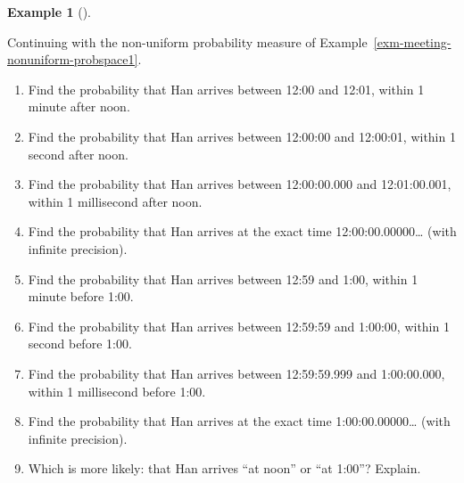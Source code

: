 \documentclass[
  letterpaper,
  DIV=11,
  numbers=noendperiod]{scrreprt}
\providecommand{\tightlist}{%
  \setlength{\itemsep}{0pt}\setlength{\parskip}{0pt}}
\theoremstyle{plain}
\theoremstyle{definition}
\newtheorem{example}{Example}[chapter]
\theoremstyle{definition}
\theoremstyle{definition}
\theoremstyle{remark}
\begin{document}
\begin{tcolorbox}[enhanced jigsaw, opacityback=0, left=2mm, colframe=quarto-callout-note-color-frame, toprule=.15mm, breakable, colback=white, leftrule=.75mm, arc=.35mm, rightrule=.15mm, bottomrule=.15mm]

\begin{example}[]\protect\hypertarget{exm-meeting-probspace1d-limit-nonuniform}{}\label{exm-meeting-probspace1d-limit-nonuniform}

Continuing with the non-uniform probability measure of
Example~\ref{exm-meeting-nonuniform-probspace1}.

\begin{enumerate}
\def\labelenumi{\arabic{enumi}.}
\tightlist
\item
  Find the probability that Han arrives between 12:00 and 12:01, within
  1 minute after noon.
\item
  Find the probability that Han arrives between 12:00:00 and 12:00:01,
  within 1 second after noon.
\item
  Find the probability that Han arrives between 12:00:00.000 and
  12:01:00.001, within 1 millisecond after noon.
\item
  Find the probability that Han arrives at the exact time
  12:00:00.00000\ldots{} (with infinite precision).
\item
  Find the probability that Han arrives between 12:59 and 1:00, within 1
  minute before 1:00.
\item
  Find the probability that Han arrives between 12:59:59 and 1:00:00,
  within 1 second before 1:00.
\item
  Find the probability that Han arrives between 12:59:59.999 and
  1:00:00.000, within 1 millisecond before 1:00.
\item
  Find the probability that Han arrives at the exact time
  1:00:00.00000\ldots{} (with infinite precision).
\item
  Which is more likely: that Han arrives ``at noon'' or ``at 1:00''?
  Explain.
\end{enumerate}

\end{example}

\end{tcolorbox}
\end{document}
